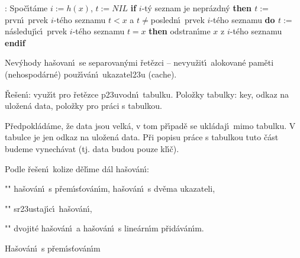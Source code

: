 :\newline 
Spo\v c\'\i t\'ame $i:=h\left(x\right)$, $t:=NIL$
{\bf if} $i$-t\'y seznam je nepr\'azdn\'y {\bf then\newline 
\phantom{{\rm ---}}$t:=$}prvn\'\i\ prvek $i$-t\'eho seznamu\newline 
\phantom{---}{\bf while} $t<x$ a $t\ne$posledn\'\i\ prvek $i$-t\'eho seznamu {\bf do\newline 
\phantom{{\rm ------}}$t:=$}n\'asleduj\'\i c\'\i\ prvek $i$-t\'eho seznamu\newline 
\phantom{---}{\bf enddo\newline 
endif\newline 
if} $t=x$ {\bf then} odstran\'\i me $x$ z $i$-t\'eho seznamu {\bf endif}
\bigskip

\flushpar Nev\'yhody ha\v sovan\'\i\ se separovan\'ymi \v ret\v ezci --\newline 
\phantom{---}nevyu\v zit\'\i\ alokovan\'e pam\v eti (nehospod\'arn\'e)\newline 
\phantom{---}pou\v z\'\i v\'an\'\i\ ukazatel\accent23u (cache).\newline 

\flushpar\v Re\v sen\'\i : vyu\v z\'\i t pro \v ret\v ezce p\accent23uvodn\'\i\ tabulku. 
\medskip
\flushpar Polo\v zky tabulky:\newline 
\phantom{---}key,\newline 
\phantom{---}odkaz na ulo\v zen\'a data,\newline 
\phantom{---}polo\v zky pro pr\'aci s tabulkou.
\medskip

\flushpar P\v redpokl\'ad\'ame, \v ze data jsou velk\'a, v tom p\v r\'\i pad\v e se 
ukl\'adaj\'\i\ mimo tabulku. V tabulce je jen odkaz na ulo\v zen\'a data. 
P\v ri popisu pr\'ace s tabulkou tuto \v c\'ast budeme vynech\'avat (tj. 
data budou pouze kl\'\i\v c).
\medskip

\flushpar Podle \v re\v sen\'\i\ kolize d\v el\'\i me d\'al ha\v sov\'an\'\i :
\roster
\item"{}"
ha\v sov\'an\'\i\ s p\v rem\'\i s\v tov\'an\'\i m, ha\v sov\'an\'\i\ s dv\v ema 
ukazateli, 
\item"{}"
sr\accent23ustaj\'\i c\'\i\ ha\v sov\'an\'\i,
\item"{}"
dvojit\'e ha\v sov\'an\'\i\ a ha\v sov\'an\'\i\ s line\'arn\'\i m 
p\v rid\'av\'an\'\i m.
\endroster 

\heading
Ha\v sov\'an\'\i\ s p\v rem\'\i s\v tov\'an\'\i m
\endheading

